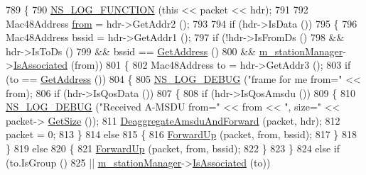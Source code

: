 \begin{DoxyCode}
789 \{
790   \hyperlink{log-macros-disabled_8h_a90b90d5bad1f39cb1b64923ea94c0761}{NS\_LOG\_FUNCTION} (\textcolor{keyword}{this} << packet << hdr);
791 
792   Mac48Address \hyperlink{lte__amc_8m_a1b4c81ff74eb1a626b5ade44c81004b3}{from} = hdr->GetAddr2 ();
793 
794   \textcolor{keywordflow}{if} (hdr->IsData ())
795     \{
796       Mac48Address bssid = hdr->GetAddr1 ();
797       \textcolor{keywordflow}{if} (!hdr->IsFromDs ()
798           && hdr->IsToDs ()
799           && bssid == \hyperlink{classns3_1_1RegularWifiMac_aea719a7d05fbc664c50479fc900777b7}{GetAddress} ()
800           && \hyperlink{classns3_1_1RegularWifiMac_a76d1a5e27b64bfe36f24a55d1eea2775}{m\_stationManager}->\hyperlink{classns3_1_1WifiRemoteStationManager_a1c3e9d6c0ca04ccb08793d034d9d156f}{IsAssociated} (from))
801         \{
802           Mac48Address to = hdr->GetAddr3 ();
803           \textcolor{keywordflow}{if} (to == \hyperlink{classns3_1_1RegularWifiMac_aea719a7d05fbc664c50479fc900777b7}{GetAddress} ())
804             \{
805               \hyperlink{group__logging_ga413f1886406d49f59a6a0a89b77b4d0a}{NS\_LOG\_DEBUG} (\textcolor{stringliteral}{"frame for me from="} << from);
806               \textcolor{keywordflow}{if} (hdr->IsQosData ())
807                 \{
808                   \textcolor{keywordflow}{if} (hdr->IsQosAmsdu ())
809                     \{
810                       \hyperlink{group__logging_ga413f1886406d49f59a6a0a89b77b4d0a}{NS\_LOG\_DEBUG} (\textcolor{stringliteral}{"Received A-MSDU from="} << from << \textcolor{stringliteral}{", size="} << packet->
      \hyperlink{classns3_1_1Packet_a462855c9929954d4301a4edfe55f4f1c}{GetSize} ());
811                       \hyperlink{classns3_1_1ApWifiMac_a1eb0f6a5911786e99fc0b58fd2a0e356}{DeaggregateAmsduAndForward} (packet, hdr);
812                       packet = 0;
813                     \}
814                   \textcolor{keywordflow}{else}
815                     \{
816                       \hyperlink{classns3_1_1RegularWifiMac_a34df292af97e69fefda8303cdb323d1d}{ForwardUp} (packet, from, bssid);
817                     \}
818                 \}
819               \textcolor{keywordflow}{else}
820                 \{
821                   \hyperlink{classns3_1_1RegularWifiMac_a34df292af97e69fefda8303cdb323d1d}{ForwardUp} (packet, from, bssid);
822                 \}
823             \}
824           \textcolor{keywordflow}{else} \textcolor{keywordflow}{if} (to.IsGroup ()
825                    || \hyperlink{classns3_1_1RegularWifiMac_a76d1a5e27b64bfe36f24a55d1eea2775}{m\_stationManager}->\hyperlink{classns3_1_1WifiRemoteStationManager_a1c3e9d6c0ca04ccb08793d034d9d156f}{IsAssociated} (to))

\end{DoxyCode}
